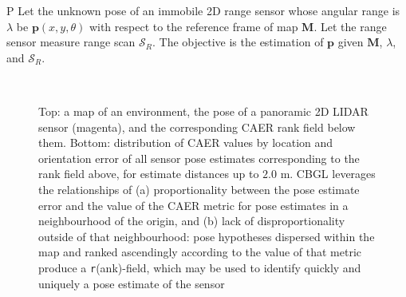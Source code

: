 \begin{customprb}{P}
  \label{prob:the_problem}
  Let the unknown pose of an immobile 2D range sensor whose angular range is
  $\lambda$ be $\bm{p}(x,y,\theta)$ with respect to the reference frame of map
  $\bm{M}$. Let the range sensor measure range scan $\mathcal{S}_R$. The
  objective is the estimation of $\bm{p}$ given $\bm{M}$, $\lambda$, and
  $\mathcal{S}_R$.
\end{customprb}

\begin{figure}\vspace{0.4em}
  \subfloat{    \label{fig:a}} \vspace{-1.7cm}\\
  \subfloat{\hspace{-0.3cm} \label{fig:b}}
  \caption{\small
           Top: a map of an environment, the pose of a panoramic 2D LIDAR
           sensor (magenta), and the corresponding CAER rank field below them.
           Bottom: distribution of CAER values by location and orientation
           error of all sensor pose estimates corresponding to the
           rank field above, for estimate distances up to $2.0$ m.
           CBGL leverages the relationships of (a) proportionality between the
           pose estimate error and the value of the CAER metric for pose
           estimates in a neighbourhood of the origin, and (b) lack of
           disproportionality outside of that neighbourhood: pose hypotheses
           dispersed within the map and ranked ascendingly according to the
           value of that metric produce a \texttt{r}(ank)-field, which may be
           used to identify quickly and uniquely a pose estimate of the
           sensor%
           }
  \vspace{-0.75cm}
  \label{fig:AB}
\end{figure}

